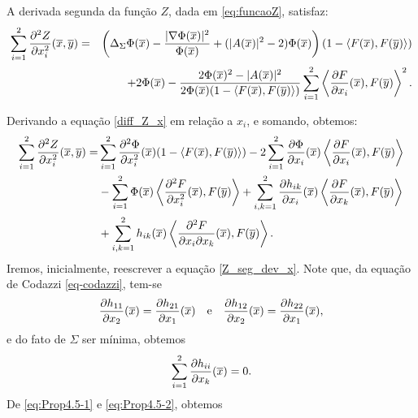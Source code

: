 \begin{proposicao}
A derivada segunda da fun\c c\~ao $Z$, dada em \eqref{eq:funcaoZ},
satisfaz:
\begin{eqnarray*}\label{2_diff_Z_x}
\sum_{i=1}^{2} \frac{\partial^2 Z}{\partial x_i^2} (\overline{x},\overline{y}) &=& 
\left( \Delta_{\Sigma} \Phi(\overline{x}) - \frac{| \nabla \Phi(\overline{x}) |^2}{\Phi(\overline{x})} 
+ (|A(\overline{x})|^2 - 2) \Phi(\overline{x}) \right) (1 - \left\langle F(\overline{x}), F(\overline{y}) \right\rangle) \\ 
&&+ 2 \Phi(\overline{x}) - \frac{2 \Phi(\overline{x})^2 - |A(\overline{x})|^2}{2 \Phi(\overline{x})
 (1 - \langle F(\overline{x}), F(\overline{y}) \rangle)} \sum_{i=1}^2 \left\langle 
 \frac{\partial F}{\partial x_i}(\overline{x}), F(\overline{y}) \right\rangle^2.
\end{eqnarray*}
\end{proposicao}
\begin{demonstracao}
Derivando a equação \eqref{diff_Z_x} em rela\c c\~ao a $x_i$,
e somando, obtemos:
\begin{eqnarray}\label{Z_seg_dev_x}
\begin{aligned}
\sum_{i=1}^2\frac{\partial^2 Z}{\partial x_i^2}(\overline{x},\overline{y}) = &
\sum_{i=1}^2\frac{\partial^2 \Phi}{\partial x_i^2}(\overline{x})
(1 - \langle F(\overline{x}), F(\overline{y}) \rangle) -
2\sum_{i=1}^2\frac{\partial \Phi}{\partial x_i}(\overline{x}) 
\left\langle \frac{\partial F}{\partial x_i}(\overline{x}), F(\overline{y}) \right\rangle \\
& - \sum_{i=1}^2\Phi(\overline{x}) \left\langle\frac{\partial^2 F}{\partial x_i^2}(\overline{x}),F(\overline{y})
\right\rangle + \sum_{i,k=1}^2\frac{\partial h_{ik}}{\partial x_i}(\overline{x})
\left\langle \frac{\partial F}{\partial x_k}(\overline{x}), F(\overline{y})\right\rangle \\ 
&+ \sum_{i,k=1}^2h_{ik}(\overline{x})\left\langle
\frac{\partial^2 F}{\partial x_i \partial x_k}(\overline{x}), F(\overline{y})\right\rangle.
\end{aligned}
\end{eqnarray}
Iremos, inicialmente, reescrever a equa\c c\~ao \eqref{Z_seg_dev_x}.
Note que, da equa\c c\~ao de Codazzi \eqref{eq-codazzi}, tem-se
\begin{eqnarray}\label{eq:Prop4.5-1}
\frac{\partial h_{11}}{\partial x_2}(\overline{x}) = \frac{\partial h_{21}}{\partial x_1}(\overline{x})
\quad\mbox{e}\quad
\frac{\partial h_{12}}{\partial x_2}(\overline{x}) = \frac{\partial h_{22}}{\partial x_1}(\overline{x}),
\end{eqnarray}
e do fato de $\Sigma$ ser m\'inima, obtemos
\begin{eqnarray}\label{eq:Prop4.5-2}
\sum_{i=1}^2\frac{\partial h_{ii}}{\partial x_k}(\overline{x}) = 0.
\end{eqnarray}
De \eqref{eq:Prop4.5-1} e \eqref{eq:Prop4.5-2}, obtemos

\end{demonstracao}
